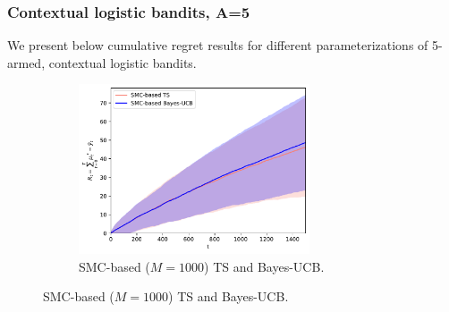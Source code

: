 \clearpage
\subsubsection{Contextual logistic bandits, A=5}
\label{asssec:static_bandits_logistic_5}

We present below cumulative regret results for different parameterizations of 5-armed, contextual logistic bandits.

\begin{figure}[!h]
	\centering
	\begin{subfigure}[b]{\textwidth}
		\centering
		\includegraphics[width=0.75\textwidth]{./fods_figs/static/logistic/A5/theta-0.2_-0.2_-0.1_-0.1_0._0._0.1_0.1_0.2_0.2_M1000_cumulative_regret}
		\caption{SMC-based ($M=1000$) TS and Bayes-UCB.}
	\end{subfigure}
	

\end{figure}
